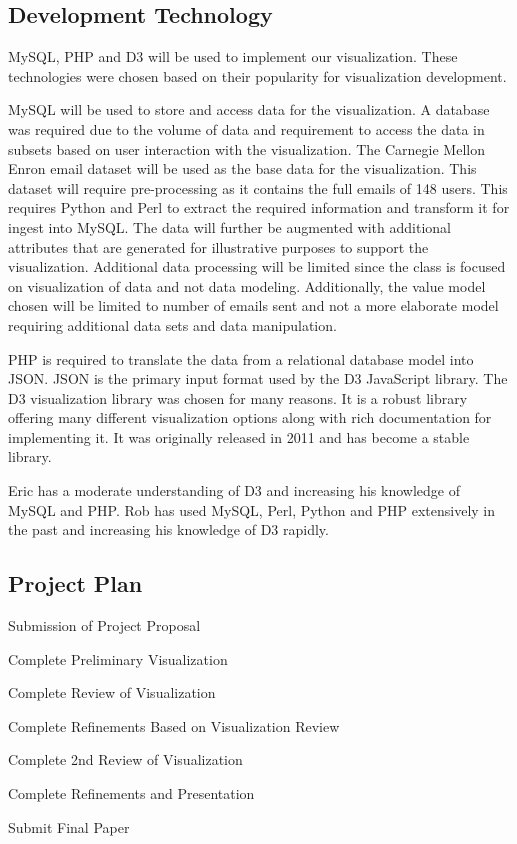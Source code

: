\documentclass{soups}
\begin{document}
\subsection{Development Technology}
MySQL, PHP and D3 will be used to implement our visualization.  These technologies were chosen based on their popularity for visualization development.

MySQL will be used to store and access data for the visualization.  A database was required due to the volume of data and requirement to access the data in subsets based on user interaction with the visualization.  The Carnegie Mellon Enron email dataset\cite{cmuenron} will be used as the base data for the visualization.  This dataset will require pre-processing as it contains the full emails of 148 users.  This requires Python and Perl to extract the required information and transform it for ingest into MySQL.  The data will further be augmented with additional attributes that are generated for illustrative purposes to support the visualization.  Additional data processing will be limited since the class is focused on visualization of data and not data modeling.  Additionally, the value model chosen will be limited to number of emails sent and not a more elaborate model requiring additional data sets and data manipulation. 

PHP is required to translate the data from a relational database model into JSON.  JSON is the primary input format used by the D3 JavaScript library.  The D3 visualization library was chosen for many reasons.  It is a robust library offering many different visualization options along with rich documentation for implementing it.  It was originally released in 2011 and has become a stable library.

Eric has a moderate understanding of D3 and increasing his knowledge of MySQL and PHP.  Rob has used MySQL, Perl, Python and PHP extensively in the past and increasing his knowledge of D3 rapidly.

\subsection{Project Plan}
\begin{description}[leftmargin=7em, style=nextline]
\item [26 Oct 2018] Submission of Project Proposal
\item [04 Nov 2018]  Complete Preliminary Visualization
\item [11 Nov 2018] Complete Review of Visualization
\item [18 Nov 2018] Complete Refinements Based on Visualization Review
\item [25 Nov 2018] Complete 2nd Review of Visualization
\item [30 Nov 2018] Complete Refinements and Presentation
\item [14 Dec 2018] Submit Final Paper
\end{description}


\printbibliography
\end{document}
